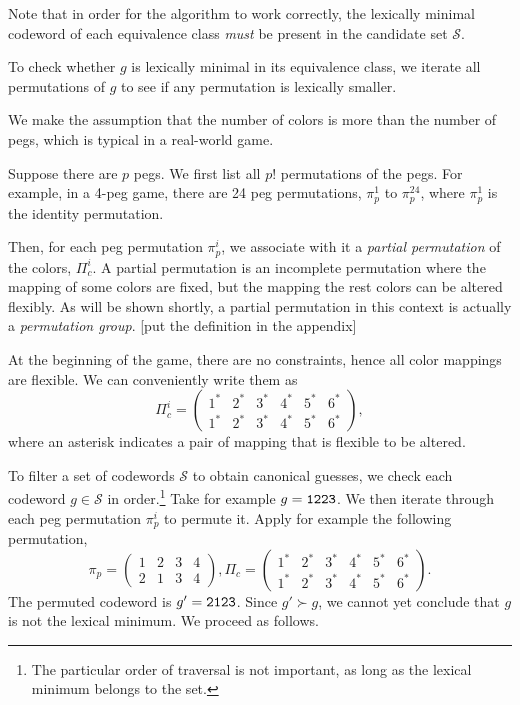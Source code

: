 Note that in order for the algorithm to work correctly, the lexically minimal codeword of each equivalence class \emph{must} be present in the candidate set $\mathcal{S}$.

To check whether $g$ is lexically minimal in its equivalence class, we iterate all permutations of $g$ to see if any permutation is lexically smaller. 

We make the assumption that the number of colors is more than the number of pegs, which is typical in a real-world game.

Suppose there are $p$ pegs. We first list all $p!$ permutations of the pegs. For example, in a 4-peg game, there are 24 peg permutations, $\pi_p^1$ to $\pi_p^{24}$, where $\pi_p^1$ is the identity permutation.

Then, for each peg permutation $\pi_p^i$, we associate with it a \emph{partial permutation} of the colors, $\Pi_c^i$. A partial permutation is an incomplete permutation where the mapping of some colors are fixed, but the mapping the rest colors can be altered flexibly. As will be shown shortly, a partial permutation in this context is actually a \emph{permutation group}. [put the definition in the appendix]

At the beginning of the game, there are no constraints, hence all color mappings are flexible. We can conveniently write them as
\[
\Pi_c^i = 
\begin{pmatrix}
1^* & 2^* & 3^* & 4^* & 5^* & 6^*  \\
1^* & 2^* & 3^* & 4^* & 5^* & 6^* 
\end{pmatrix} ,
\]
where an asterisk indicates a pair of mapping that is flexible to be altered.

To filter a set of codewords $\mathcal{S}$ to obtain canonical guesses, we check each codeword $g \in \mathcal{S}$ in order.\footnote{The particular order of traversal is not important, as long as the lexical minimum belongs to the set.} 
Take for example $g = \texttt{1223}$. We then iterate through each peg permutation $\pi_p^i$ to permute it. Apply for example the following permutation,
\[
\pi_p = 
\begin{pmatrix}
1 & 2 & 3 & 4 \\
2 & 1 & 3 & 4
\end{pmatrix} ,
\Pi_c = 
\begin{pmatrix}
1^* & 2^* & 3^* & 4^* & 5^* & 6^*  \\
1^* & 2^* & 3^* & 4^* & 5^* & 6^* 
\end{pmatrix} .
\]
The permuted codeword is $g' = \texttt{2123}$. Since $g' \succ g$, we cannot yet conclude that $g$ is not the lexical minimum. We proceed as follows.

